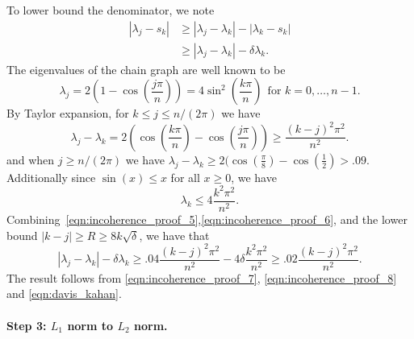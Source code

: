 \documentclass{article}
\newcommand{\abs}[1]{\left \lvert #1 \right \rvert}
\newcommand{\1}{\mathbf{1}}
\theoremstyle{alden}
\theoremstyle{aldenthm}
\theoremstyle{definition}
\theoremstyle{remark}
\begin{document}
To lower bound the denominator, we note
\begin{align}
\abs{\lambda_j - s_k} & \geq \abs{\lambda_j - \lambda_k} - \abs{\lambda_k - s_k} \nonumber \\
& \geq \abs{\lambda_j - \lambda_k} - \delta \lambda_k. \label{eqn:incoherence_proof_8}
\end{align}
The eigenvalues of the chain graph are well known to be
\begin{equation*}
\lambda_j = 2\left(1 - \cos\left(\frac{j\pi}{n}\right)\right) = 4\sin^2\left(\frac{k\pi}{n}\right) ~~\textrm{for $k = 0,\ldots,n - 1$.}
\end{equation*}
By Taylor expansion, for $k \leq j \leq n/(2\pi)$ we have
\begin{equation}
\label{eqn:incoherence_proof_5}
\lambda_j - \lambda_k = 2\left(\cos\left(\frac{k\pi}{n}\right) - \cos\left(\frac{j\pi}{n}\right)\right) \geq \frac{(k - j)^2\pi^2}{n^2}.
\end{equation}
and when $j \geq n/(2\pi)$ we have $\lambda_j - \lambda_k \geq 2(\cos\left(\frac{\pi}{8}\right) - \cos\left(\frac{1}{2}\right) > .09$. Additionally since $\sin(x) \leq x$ for all $x \geq 0$, we have
\begin{equation}
\label{eqn:incoherence_proof_6}
\lambda_k \leq 4\frac{k^2\pi^2}{n^2}.
\end{equation}
Combining~\eqref{eqn:incoherence_proof_5},\eqref{eqn:incoherence_proof_6}, and the lower bound $\abs{k - j} \geq R \geq 8k\sqrt{\delta}$, we have that
\begin{equation}
\label{eqn:incoherence_proof_7}
\abs{\lambda_j - \lambda_k} - \delta \lambda_k \geq .04\frac{(k - j)^2\pi^2}{n^2} - 4 \delta\frac{k^2\pi^2}{n^2} \geq .02\frac{(k - j)^2\pi^2}{n^2}.
\end{equation}
The result follows from \eqref{eqn:incoherence_proof_7}, \eqref{eqn:incoherence_proof_8} and \eqref{eqn:davis_kahan}.

\paragraph{Step 3: $L_1$ norm to $L_2$ norm.}
\end{document}
